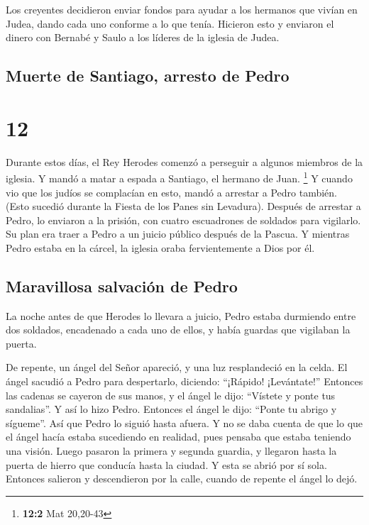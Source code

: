  Los creyentes decidieron enviar fondos para ayudar a los
hermanos que vivían en Judea, dando cada uno conforme a lo que tenía.
 Hicieron esto y enviaron el dinero con Bernabé y Saulo a
los líderes de la iglesia de Judea.

\hypertarget{muerte-de-santiago-arresto-de-pedro}{%
\subsection{Muerte de Santiago, arresto de
Pedro}\label{muerte-de-santiago-arresto-de-pedro}}

\hypertarget{section-11}{%
\section{12}\label{section-11}}

 Durante estos días, el Rey Herodes comenzó a perseguir a
algunos miembros de la iglesia.  Y mandó a matar a espada
a Santiago, el hermano de Juan. \footnote{\textbf{12:2} Mat 20,20-43}
 Y cuando vio que los judíos se complacían en esto, mandó
a arrestar a Pedro también. (Esto sucedió durante la Fiesta de los Panes
sin Levadura).  Después de arrestar a Pedro, lo enviaron a
la prisión, con cuatro escuadrones de soldados para vigilarlo. Su plan
era traer a Pedro a un juicio público después de la Pascua.
 Y mientras Pedro estaba en la cárcel, la iglesia oraba
fervientemente a Dios por él.

\hypertarget{maravillosa-salvaciuxf3n-de-pedro}{%
\subsection{Maravillosa salvación de
Pedro}\label{maravillosa-salvaciuxf3n-de-pedro}}

 La noche antes de que Herodes lo llevara a juicio, Pedro
estaba durmiendo entre dos soldados, encadenado a cada uno de ellos, y
había guardas que vigilaban la puerta.

 De repente, un ángel del Señor apareció, y una luz
resplandeció en la celda. El ángel sacudió a Pedro para despertarlo,
diciendo: ``¡Rápido! ¡Levántate!'' Entonces las cadenas se cayeron de
sus manos,  y el ángel le dijo: ``Vístete y ponte tus
sandalias''. Y así lo hizo Pedro. Entonces el ángel le dijo: ``Ponte tu
abrigo y sígueme''.  Así que Pedro lo siguió hasta afuera.
Y no se daba cuenta de que lo que el ángel hacía estaba sucediendo en
realidad, pues pensaba que estaba teniendo una visión. 
Luego pasaron la primera y segunda guardia, y llegaron hasta la puerta
de hierro que conducía hasta la ciudad. Y esta se abrió por sí sola.
Entonces salieron y descendieron por la calle, cuando de repente el
ángel lo dejó.

